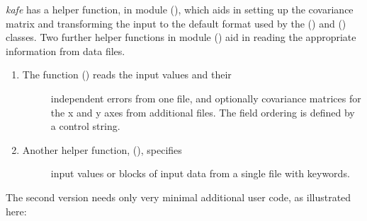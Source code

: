 \documentclass[a4paper,10pt,english]{sphinxmanual}
\begin{document}
\emph{kafe} has a helper function,  in module {\hyperref[module_doc:module-fit]{\emph{}}} (),
which aids in setting up the covariance matrix and transforming
the input to the default format used by the {\hyperref[module_doc:kafe.dataset.Dataset]{\emph{}}} () and {\hyperref[module_doc:kafe.fit.Fit]{\emph{}}} ()
classes. Two further helper functions in module {\hyperref[module_doc:module-file_tools]{\emph{}}} ()
aid in reading the appropriate information from data files.
\begin{enumerate}
\item {} \begin{description}
\item[{The function  {\hyperref[module_doc:kafe.file_tools.parse_column_data]{\emph{}}} () reads the input values and their}] \leavevmode
independent errors from one file, and optionally covariance
matrices for the x and y axes from additional files. The field ordering
is defined by a control string.

\end{description}

\item {} \begin{description}
\item[{Another helper function, {\hyperref[module_doc:kafe.file_tools.buildDataset_fromFile]{\emph{}}} (), specifies}] \leavevmode
input values or blocks of input data from a single file with
keywords.

\end{description}

\end{enumerate}

The second version needs only very minimal additional user
code, as illustrated here:
\end{document}
